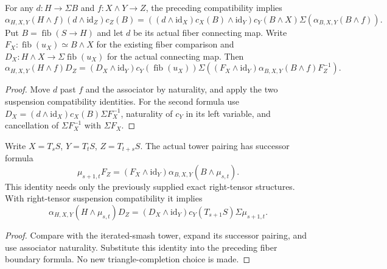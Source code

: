\begin{proposition}
  \label{prop:h6-tensor-suspended-pairing}
  \leanok
  For any $d:H\to\Sigma B$ and $f:X\wedge Y\to Z$, the preceding
  compatibility implies
  \[
    \alpha_{H,X,Y}(H\wedge f)(d\wedge\mathrm{id}_Z)c_Z(B)
      =((d\wedge\mathrm{id}_X)c_X(B)\wedge\mathrm{id}_Y)
        c_Y(B\wedge X)\Sigma(\alpha_{B,X,Y}(B\wedge f)).
  \]
  Put $B=\operatorname{fib}(S\to H)$ and let $d$ be its actual fiber
  connecting map. Write $F_X:\operatorname{fib}(u_X)\simeq B\wedge X$
  for the existing fiber comparison and $D_X:H\wedge X\to
  \Sigma\operatorname{fib}(u_X)$ for the actual connecting map. Then
  \[
    \alpha_{H,X,Y}(H\wedge f)D_Z
       =(D_X\wedge\mathrm{id}_Y)c_Y(\operatorname{fib}(u_X))
         \Sigma((F_X\wedge\mathrm{id}_Y)\alpha_{B,X,Y}
                    (B\wedge f)F_Z^{-1}).
  \]
\end{proposition}
\begin{proof}
  Move $d$ past $f$ and the associator by naturality, and apply the two
  suspension compatibility identities. For the second formula use
  $D_X=(d\wedge\mathrm{id}_X)c_X(B)\Sigma F_X^{-1}$, naturality of
  $c_Y$ in its left variable, and cancellation of $\Sigma F_X^{-1}$
  with $\Sigma F_X$.
  \leanok
\end{proof}

\begin{proposition}
  \label{prop:h6-tower-pairing-fiber-boundary}
  \leanok
  Write $X=T_sS$, $Y=T_tS$, $Z=T_{t+s}S$. The actual tower pairing has
  successor formula
  \[
    \mu_{s+1,t}F_Z=(F_X\wedge\mathrm{id}_Y)
       \alpha_{B,X,Y}(B\wedge\mu_{s,t}).
  \]
  This identity needs only the previously supplied exact right-tensor
  structures. With right-tensor suspension compatibility it implies
  \[
    \alpha_{H,X,Y}(H\wedge\mu_{s,t})D_Z
       =(D_X\wedge\mathrm{id}_Y)c_Y(T_{s+1}S)\Sigma\mu_{s+1,t}.
  \]
\end{proposition}
\begin{proof}
  Compare with the iterated-smash tower, expand its successor pairing,
  and use associator naturality. Substitute this identity into the
  preceding fiber boundary formula. No new triangle-completion choice
  is made.
  \leanok
\end{proof}

